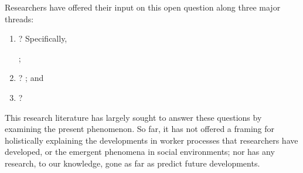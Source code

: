 \documentclass[trackingWork]{subfiles}
\begin{document}
Researchers have offered their input on this open question along three major threads:
\begin{enumerate}
  \item {}?
        Specifically,
        \cite{foundry,suzukiAtelier,KimStoria,yuanAlmost,YuEncouragingOutside,
              Nebeling:2016:WCW:2858036.2858169,
              Hahn:2016:KAB:2858036.2858364};
  \item {}?
        \cite{embracingErrorKrishna,bernsteinSoylent,sensitiveTasks,
              LykourentzouPersonalityMatters,KucherbaevReLauncher,
              Law:2016:CKC:2858036.2858144,Cai:2016:CRI:2858036.2858237,
              Chang:2016:ACC:2858036.2858411,Newell:2016:OMA:2858036.2858490}; and%
  \item {}?
        \cite{turkopticon,storiesIraniSilberman,dynamo,crowdcollab,
              whyWouldAnyoneBrewer,takingAHITMcInnis}
\end{enumerate}
This research literature has largely sought to answer these questions by examining the present phenomenon.
So far, it has not offered a framing for holistically explaining
the developments in worker processes that researchers have developed, or
the emergent phenomena in social environments;
nor has any research, to our knowledge,
gone as far as predict future developments.
\end{document}
